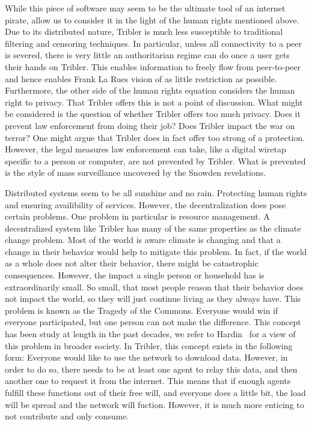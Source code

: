 \documentclass[a4paper,11pt]{book}
\theoremstyle{definition}
\begin{document}
While this piece of software may seem to be the ultimate tool of an internet pirate, 
allow us to consider it in the light of the human rights mentioned above. Due to its
distributed nature, Tribler is much less susceptible to traditional filtering and
censoring techniques. In particular, unless all connectivity to a peer is severed,
there is very little an authoritarian regime can do once a user gets their hands
on Tribler. This enables information to freely flow from peer-to-peer and hence 
enables Frank La Rues vision of as little restriction as possible. 
Furthermore, the other side of the human rights equation considers the human
right to privacy. That Tribler offers this is not a point of discussion. What might
be considered is the question of whether Tribler offers too much privacy. Does it
prevent law enforcement from doing their job? Does Tribler impact the war on terror?
One might argue that Tribler does in fact offer too strong of a protection.
However, the legal measures law enforcement can take, like a digital
wiretap specific to a person or computer, are not prevented by Tribler. What is
prevented is the style of mass surveillance uncovered by the Snowden revelations. 

Distributed systems seem to be all sunshine and no rain. Protecting human rights 
and ensuring availibility of services. However, the decentralization does pose certain 
problems. One problem in particular is resource management. A decentralized system
like Tribler has many of the same properties as the climate change problem. Most of the
world is aware climate is changing and that a change in their behavior would help to
mitigate this problem. In fact, if the world as a whole does not alter their behavior,
there might be catastrophic consequences. However, the impact a single person or household
has is extraordinarily small. So small, that most people reason that their behavior
does not impact the world, so they will just continue living as they always have. 
This problem is known as the Tragedy of the Commons. Everyone would win if everyone
participated, but one person can not make the difference. 
This concept has been study at length in the past decades, we refer to
Hardin~\cite{hardin2009tragedy} for a view of this problem in broader society.
In Tribler, this concept exists in the following form: Everyone would like to use 
the network to download data. However, in order to do so, there needs to be at least
one agent to relay this data, and then another one to request it from the internet.
This means that if enough agents fulfill these functions out of their free will,
and everyone does a little bit, the load will be spread and the network will
fuction. However, it is much more enticing to not contribute and only consume.
\end{document}
